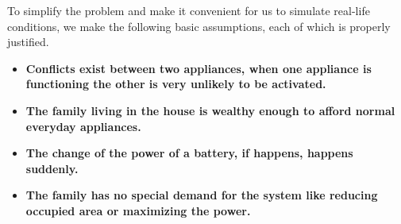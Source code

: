 \documentclass[12pt]{article}
\begin{document}
To simplify the problem and make it convenient for us to simulate real-life conditions, we make the following basic assumptions, each of which is properly justified.

\begin{itemize}
    \item {\bf Conflicts exist between two appliances, when one appliance is functioning the other is very unlikely to be activated.}
    \item {\bf The family living in the house is wealthy enough to afford normal everyday appliances.}

    \item {\bf The change of the power of a battery, if happens,  happens suddenly.}

    \item {\bf The family has no special demand for the system like reducing occupied area or maximizing the power.}

\end{itemize}
\end{document}

